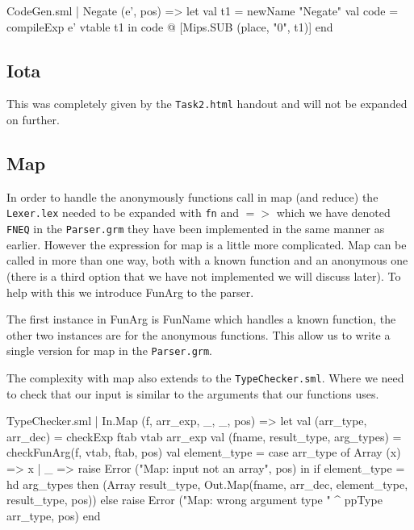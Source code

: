 \documentclass[11pt,a4paper,oneside]{report}
\begin{document}
\begin{code}[firstnumber=265]{CodeGen.sml}
  | Negate (e', pos) =>
    let
      val t1 = newName "Negate"
      val code = compileExp e' vtable t1
    in
      code @ [Mips.SUB (place, "0", t1)]
    end
\end{code}

\subsection*{Iota}
This was completely given by the \texttt{Task2.html} handout and will not be expanded on further.

\subsection*{Map}
In order to handle the anonymously functions call in map (and reduce) the \texttt{Lexer.lex} needed to be expanded with \texttt{fn} and $=>$ which we have denoted \texttt{FNEQ} in the \texttt{Parser.grm} they have been implemented in the same manner as earlier.
However the expression for map is a little more complicated. Map can be called in more than one way, both with a known function and an anonymous one (there is a third option that we have not implemented we will discuss later). To help with this we introduce FunArg to the parser.
The first instance in FunArg is FunName which handles a known function, the other two instances are for the anonymous functions. This allow us to write a single version for map in the \texttt{Parser.grm}.

The complexity with map also extends to the \texttt{TypeChecker.sml}. Where we need to check that our input is similar to the arguments that our functions uses.
\begin{code}[firstnumber=239]{TypeChecker.sml}
| In.Map (f, arr_exp, _, _, pos)
      =>
      let
val (arr_type, arr_dec) = checkExp ftab vtab arr_exp
val (fname, result_type, arg_types) = checkFunArg(f, vtab, ftab, pos)
val element_type = case arr_type of
                 Array (x) => x
               | _ => raise Error ("Map: input not an array", pos)
      in
  if element_type = hd arg_types
  then (Array result_type, Out.Map(fname,
    arr_dec, element_type, result_type, pos))
  else raise Error ("Map: wrong argument type " ^
                              ppType arr_type, pos)
      end
\end{code}
\end{document}
